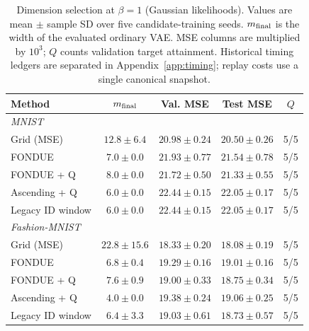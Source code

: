 \begin{table}[H]
\caption{Dimension selection at $\beta=1$ (Gaussian likelihoods). Values are mean $\pm$ sample SD over five candidate-training seeds. $m_{\rm final}$ is the width of the evaluated ordinary VAE. MSE columns are multiplied by $10^3$; $Q$ counts validation target attainment. Historical timing ledgers are separated in Appendix~\ref{app:timing}; replay costs use a single canonical snapshot.}\label{tab:main1}
\footnotesize
\setlength{\tabcolsep}{3.5pt}
\begin{tabular*}{\textwidth}{@{\extracolsep{\fill}}lcccc@{}}
\toprule
Method & $m_{\rm final}$ & Val. MSE & Test MSE & $Q$ \\
\midrule
\multicolumn{5}{l}{\emph{MNIST}} \\
Grid (MSE) & $12.8 \pm 6.4$ & $20.98 \pm 0.24$ & $20.50 \pm 0.26$ & 5/5 \\
FONDUE & $7.0 \pm 0.0$ & $21.93 \pm 0.77$ & $21.54 \pm 0.78$ & 5/5 \\
FONDUE + Q & $8.0 \pm 0.0$ & $21.72 \pm 0.50$ & $21.33 \pm 0.55$ & 5/5 \\
Ascending + Q & $6.0 \pm 0.0$ & $22.44 \pm 0.15$ & $22.05 \pm 0.17$ & 5/5 \\
Legacy ID window & $6.0 \pm 0.0$ & $22.44 \pm 0.15$ & $22.05 \pm 0.17$ & 5/5 \\
\midrule
\multicolumn{5}{l}{\emph{Fashion-MNIST}} \\
Grid (MSE) & $22.8 \pm 15.6$ & $18.33 \pm 0.20$ & $18.08 \pm 0.19$ & 5/5 \\
FONDUE & $6.8 \pm 0.4$ & $19.29 \pm 0.16$ & $19.01 \pm 0.16$ & 5/5 \\
FONDUE + Q & $7.6 \pm 0.9$ & $19.00 \pm 0.33$ & $18.75 \pm 0.34$ & 5/5 \\
Ascending + Q & $4.0 \pm 0.0$ & $19.38 \pm 0.24$ & $19.06 \pm 0.25$ & 5/5 \\
Legacy ID window & $6.4 \pm 3.3$ & $19.03 \pm 0.61$ & $18.73 \pm 0.57$ & 5/5 \\
\bottomrule
\end{tabular*}
\end{table}
